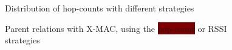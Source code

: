 \documentclass[a4paper]{llncs}
\begin{document}
\begin{figure}
	\centering
	
	\caption{Distribution of hop-counts with different strategies}
	\label{fig:distribution}
\end{figure}

\begin{figure}
	\centering
	
	\caption{Parent relations with X-MAC, using the \colorbox{Maroon}{\color{white}hop-count} or \colorbox{JungleGreen}{RSSI} strategies}
	\label{fig:map-hopcount}
\end{figure}

\printbibliography
\end{document}
